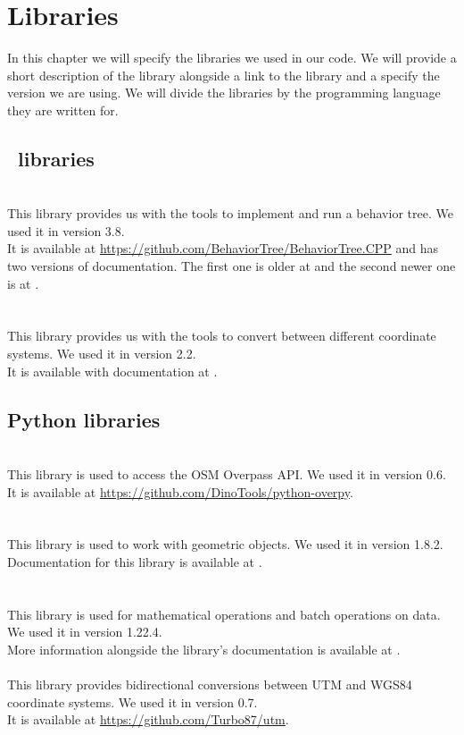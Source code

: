 \chapter{Libraries}
\label{sec:libraries}
    In this chapter we will specify the libraries we used in our code. We will provide a short description of the library alongside a link to the library and a specify the version we are using. We will divide the libraries by the programming language they are written for.

    \section{\CC\ libraries}
        \\
            This library provides us with the tools to implement and run a behavior tree. We used it in version 3.8.\\
            It is available at \url{https://github.com/BehaviorTree/BehaviorTree.CPP} and has two versions of documentation. The first one is older at \cite{BT_docs} and the second newer one is at \cite{BT_docs_new}.\\\\
        \\
            This library provides us with the tools to convert between different coordinate systems. We used it in version 2.2.\\
            It is available with documentation at \cite{GeographicLib}.

    \section{Python libraries}
        \\
            This library is used to access the OSM Overpass API. We used it in version 0.6.\\
            It is available at \url{https://github.com/DinoTools/python-overpy}.\\\\
        \\
            This library is used to work with geometric objects. We used it in version 1.8.2.\\
            Documentation for this library is available at \cite{shapely}.\\\\
        \\
            This library is used for mathematical operations and batch operations on data. We used it in version 1.22.4.\\
            More information alongside the library's documentation is available at \cite{numpy}.\\
        \\
            This library provides bidirectional conversions between UTM and WGS84 coordinate systems. We used it in version 0.7.\\
            It is available at \url{https://github.com/Turbo87/utm}.

